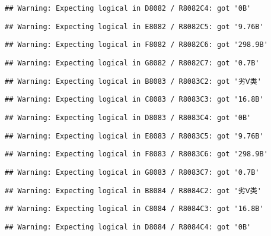 \documentclass[
]{article}
\begin{document}
\begin{verbatim}
## Warning: Expecting logical in D8082 / R8082C4: got '0B'
\end{verbatim}

\begin{verbatim}
## Warning: Expecting logical in E8082 / R8082C5: got '9.76B'
\end{verbatim}

\begin{verbatim}
## Warning: Expecting logical in F8082 / R8082C6: got '298.9B'
\end{verbatim}

\begin{verbatim}
## Warning: Expecting logical in G8082 / R8082C7: got '0.7B'
\end{verbatim}

\begin{verbatim}
## Warning: Expecting logical in B8083 / R8083C2: got '劣Ⅴ类'
\end{verbatim}

\begin{verbatim}
## Warning: Expecting logical in C8083 / R8083C3: got '16.8B'
\end{verbatim}

\begin{verbatim}
## Warning: Expecting logical in D8083 / R8083C4: got '0B'
\end{verbatim}

\begin{verbatim}
## Warning: Expecting logical in E8083 / R8083C5: got '9.76B'
\end{verbatim}

\begin{verbatim}
## Warning: Expecting logical in F8083 / R8083C6: got '298.9B'
\end{verbatim}

\begin{verbatim}
## Warning: Expecting logical in G8083 / R8083C7: got '0.7B'
\end{verbatim}

\begin{verbatim}
## Warning: Expecting logical in B8084 / R8084C2: got '劣Ⅴ类'
\end{verbatim}

\begin{verbatim}
## Warning: Expecting logical in C8084 / R8084C3: got '16.8B'
\end{verbatim}

\begin{verbatim}
## Warning: Expecting logical in D8084 / R8084C4: got '0B'
\end{verbatim}
\end{document}

